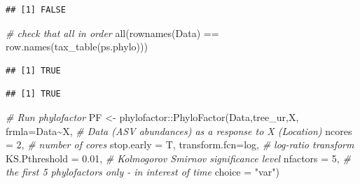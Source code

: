 \documentclass[
]{book}
\newenvironment{Shaded}{\begin{snugshade}}{\end{snugshade}}
\newcommand{\AttributeTok}[1]{\textcolor[rgb]{0.77,0.63,0.00}{#1}}
\newcommand{\CommentTok}[1]{\textcolor[rgb]{0.56,0.35,0.01}{\textit{#1}}}
\newcommand{\DecValTok}[1]{\textcolor[rgb]{0.00,0.00,0.81}{#1}}
\newcommand{\FloatTok}[1]{\textcolor[rgb]{0.00,0.00,0.81}{#1}}
\newcommand{\FunctionTok}[1]{\textcolor[rgb]{0.00,0.00,0.00}{#1}}
\newcommand{\NormalTok}[1]{#1}
\newcommand{\OtherTok}[1]{\textcolor[rgb]{0.56,0.35,0.01}{#1}}
\newcommand{\SpecialCharTok}[1]{\textcolor[rgb]{0.00,0.00,0.00}{#1}}
\newcommand{\StringTok}[1]{\textcolor[rgb]{0.31,0.60,0.02}{#1}}
\begin{document}
\begin{verbatim}
## [1] FALSE
\end{verbatim}

\begin{Shaded}
\begin{Highlighting}[]
\CommentTok{\# check that all in order}
\FunctionTok{all}\NormalTok{(}\FunctionTok{rownames}\NormalTok{(Data) }\SpecialCharTok{==} \FunctionTok{row.names}\NormalTok{(}\FunctionTok{tax\_table}\NormalTok{(ps.phylo))) }
\end{Highlighting}
\end{Shaded}

\begin{verbatim}
## [1] TRUE
\end{verbatim}

\begin{Shaded}
\end{Shaded}

\begin{verbatim}
## [1] TRUE
\end{verbatim}

\begin{Shaded}
\begin{Highlighting}[]
\CommentTok{\# Run phylofactor}
\NormalTok{PF }\OtherTok{\textless{}{-}}\NormalTok{  phylofactor}\SpecialCharTok{::}\FunctionTok{PhyloFactor}\NormalTok{(Data,tree\_ur,X, }
        \AttributeTok{frmla=}\NormalTok{Data}\SpecialCharTok{\textasciitilde{}}\NormalTok{X,    }\CommentTok{\# Data (ASV abundances) as a response to X (Location)}
        \AttributeTok{ncores =} \DecValTok{2}\NormalTok{,      }\CommentTok{\# number of cores }
        \AttributeTok{stop.early =}\NormalTok{ T, }
        \AttributeTok{transform.fcn=}\NormalTok{log,    }\CommentTok{\# log{-}ratio transform}
        \AttributeTok{KS.Pthreshold =} \FloatTok{0.01}\NormalTok{, }\CommentTok{\# Kolmogorov Smirnov significance level }
        \AttributeTok{nfactors =} \DecValTok{5}\NormalTok{, }\CommentTok{\# the first 5 phylofactors only {-} in interest of time }
        \AttributeTok{choice =} \StringTok{"var"}\NormalTok{)}
\end{Highlighting}
\end{Shaded}
\end{document}
